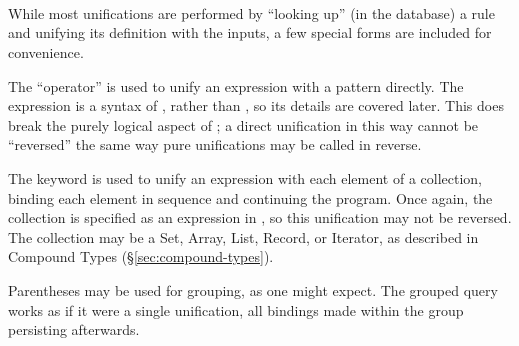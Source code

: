 \begin{bnf*}
     \\
     \\
     \\
\end{bnf*}

While most unifications are performed by ``looking up'' (in the database)
a rule and unifying its definition with the inputs, a few special forms are
included for convenience.

The \op{=} ``operator'' is used to unify an expression with a pattern directly. The
expression is a syntax of \Poetry{}, rather than \Law{}, so its details are covered
later. This does break the purely logical aspect of \Law{}; a direct unification in
this way cannot be ``reversed'' the same way pure \Law{} unifications may be called
in reverse.

\begin{prooftree}
\end{prooftree}

The  keyword is used to unify an expression with each element of a collection,
binding each element in sequence and continuing the program. Once again, the collection
is specified as an expression in \Poetry{}, so this unification may not be reversed.
The collection may be a Set, Array, List, Record, or Iterator, as described in
Compound Types (\S\ref{sec:compound-types}).

\begin{prooftree}
\end{prooftree}

Parentheses may be used for grouping, as one might expect. The grouped query works
as if it were a single unification, all bindings made within the group
persisting afterwards.

